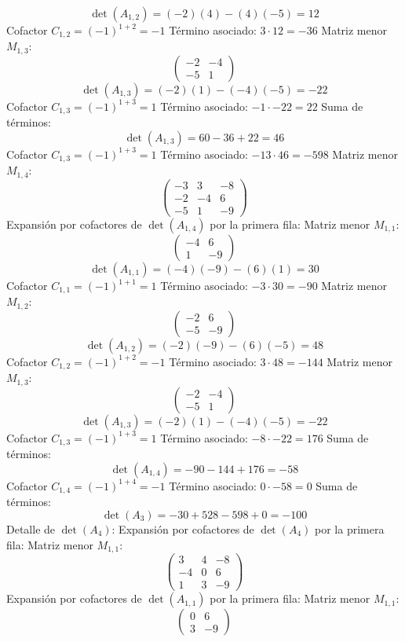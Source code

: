 \documentclass{article}
\begin{document}
\[\det(A_{1,2}) = (-2)(4) - (4)(-5) = 12\]
Cofactor $C_{1,2} = (-1)^{1+2} = -1$
Término asociado: $ 3 \cdot 12 = -36 $
Matriz menor $M_{1,3}$:
\[\begin{pmatrix}-2 & -4 \\ -5 & 1\end{pmatrix}\]
\[\det(A_{1,3}) = (-2)(1) - (-4)(-5) = -22\]
Cofactor $C_{1,3} = (-1)^{1+3} = 1$
Término asociado: $ -1 \cdot -22 = 22 $
Suma de términos:
\[\det(A_{1,3}) = 60 - 36 + 22 = 46\]
Cofactor $C_{1,3} = (-1)^{1+3} = 1$
Término asociado: $ -13 \cdot 46 = -598 $
Matriz menor $M_{1,4}$:
\[\begin{pmatrix}-3 & 3 & -8 \\ -2 & -4 & 6 \\ -5 & 1 & -9\end{pmatrix}\]
Expansión por cofactores de $\det(A_{1,4})$ por la primera fila:
Matriz menor $M_{1,1}$:
\[\begin{pmatrix}-4 & 6 \\ 1 & -9\end{pmatrix}\]
\[\det(A_{1,1}) = (-4)(-9) - (6)(1) = 30\]
Cofactor $C_{1,1} = (-1)^{1+1} = 1$
Término asociado: $ -3 \cdot 30 = -90 $
Matriz menor $M_{1,2}$:
\[\begin{pmatrix}-2 & 6 \\ -5 & -9\end{pmatrix}\]
\[\det(A_{1,2}) = (-2)(-9) - (6)(-5) = 48\]
Cofactor $C_{1,2} = (-1)^{1+2} = -1$
Término asociado: $ 3 \cdot 48 = -144 $
Matriz menor $M_{1,3}$:
\[\begin{pmatrix}-2 & -4 \\ -5 & 1\end{pmatrix}\]
\[\det(A_{1,3}) = (-2)(1) - (-4)(-5) = -22\]
Cofactor $C_{1,3} = (-1)^{1+3} = 1$
Término asociado: $ -8 \cdot -22 = 176 $
Suma de términos:
\[\det(A_{1,4}) = -90 - 144 + 176 = -58\]
Cofactor $C_{1,4} = (-1)^{1+4} = -1$
Término asociado: $ 0 \cdot -58 = 0 $
Suma de términos:
\[\det(A_{3}) = -30 + 528 - 598 + 0 = -100\]
Detalle de $\det(A_{4})$:
Expansión por cofactores de $\det(A_{4})$ por la primera fila:
Matriz menor $M_{1,1}$:
\[\begin{pmatrix}3 & 4 & -8 \\ -4 & 0 & 6 \\ 1 & 3 & -9\end{pmatrix}\]
Expansión por cofactores de $\det(A_{1,1})$ por la primera fila:
Matriz menor $M_{1,1}$:
\[\begin{pmatrix}0 & 6 \\ 3 & -9\end{pmatrix}\]
\end{document}
